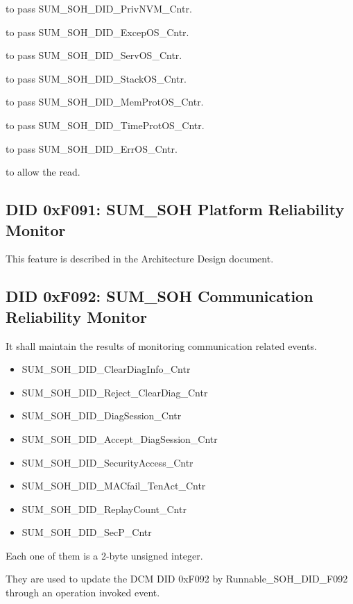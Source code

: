 {
\textbf{} to pass  SUM\_SOH\_DID\_PrivNVM\_Cntr.
}
{
}

{
\textbf{} to pass  SUM\_SOH\_DID\_ExcepOS\_Cntr.
}
{
}

{
\textbf{} to pass  SUM\_SOH\_DID\_ServOS\_Cntr.
}
{
}

{
\textbf{} to pass  SUM\_SOH\_DID\_StackOS\_Cntr.
}
{
}

{
\textbf{} to pass  SUM\_SOH\_DID\_MemProtOS\_Cntr.
}
{
}

{
\textbf{} to pass  SUM\_SOH\_DID\_TimeProtOS\_Cntr.
}
{
}

{
\textbf{} to pass  SUM\_SOH\_DID\_ErrOS\_Cntr.
}
{
}

{
\textbf{} to allow the read.
}
{
}



\subsection{DID 0xF091: SUM_SOH Platform Reliability Monitor}
This feature is described in the Architecture Design document.

\subsection{DID 0xF092: SUM_SOH Communication Reliability Monitor}

{
It shall maintain the results of monitoring communication related events.

\begin{itemize}
\item	SUM\_SOH\_DID\_ClearDiagInfo\_Cntr
\item	SUM\_SOH\_DID\_Reject_ClearDiag\_Cntr
\item	SUM\_SOH\_DID\_DiagSession\_Cntr
\item	SUM\_SOH\_DID\_Accept_DiagSession\_Cntr
\item	SUM\_SOH\_DID\_SecurityAccess\_Cntr
\item	SUM\_SOH\_DID\_MACfail_TenAct\_Cntr
\item	SUM\_SOH\_DID\_ReplayCount\_Cntr
\item	SUM\_SOH\_DID\_SecP\_Cntr
\end{itemize}
Each one of them is a 2-byte unsigned integer.

They are used to update  the DCM DID 0xF092 by Runnable\_SOH\_DID\_F092 through an operation invoked event. 
}
{
}

